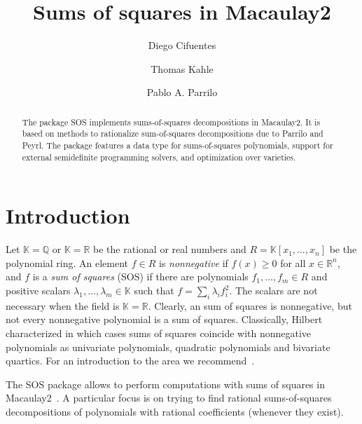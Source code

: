 \documentclass[11pt]{amsart}
\theoremstyle{plain}%
\theoremstyle{definition}
\theoremstyle{remark}
\newcommand{\Mac}{Macaulay2\xspace}
\newcommand{\SOS}{\textsc{SOS}\xspace}
\newcommand{\QQ}{\mathbb{Q}}
\newcommand{\RR}{\mathbb{R}}
\newcommand{\kk}{\mathbb{K}}
\begin{document}
\title[Sums of squares in Macaulay2]{Sums of squares in Macaulay2}

\author{Diego Cifuentes}
\address{Massachusetts Institute of Technology \\ Cambridge, MA, USA}

\author{Thomas Kahle}
\address{Otto-von-Guericke University \\ Magdeburg, Germany}

\author{Pablo A. Parrilo}
\address{Massachusetts Institute of Technology \\ Cambridge, MA, USA}


\begin{abstract}
  The package \SOS implements sums-of-squares decompositions in
  \Mac.
  It is based on methods to rationalize sum-of-squares decompositions due to Parrilo and Peyrl.
  The package features a data type for sums-of-squares polynomials, support for external semidefinite programming solvers, and optimization over varieties.
\end{abstract}

\maketitle

\section{Introduction}
\label{s:intro}

Let $\kk \!=\! \QQ$ or $\kk \!=\! \RR$ be the rational or real numbers and $R = \kk[x_{1},\dots,x_{n}]$ be the polynomial ring.
An element $f\!\in\! R$ is \emph{nonnegative} if $f(x) \!\ge\! 0$ for all $x \!\in\! \RR^{n}$,
and $f$ is a \emph{sum of squares} (SOS) if there are polynomials $f_{1},\dots,f_{m} \!\in\! R$ and positive scalars $\lambda_{1},\dots,\lambda_{m} \!\in\! \kk$ such that $f=\sum_{i}\lambda_i f_{i}^{2}$.
The scalars are not necessary when the field is $\kk\!=\!\RR$.
Clearly, an sum of squares is nonnegative, but not every nonnegative polynomial is a sum of squares.
Classically, Hilbert characterized in which cases sums of squares coincide with nonnegative polynomials as univariate polynomials, quadratic polynomials and bivariate quartics.  
For an introduction to the area we recommend~\cite{scheiderer2009positivity,blekherman2012semidefinite}.

The \SOS package allows to perform computations with sums of squares in \Mac~\cite{macaulay2}.
A particular focus is on trying to find rational sums-of-squares decompositions of polynomials with rational coefficients (whenever they exist).
\end{document}
